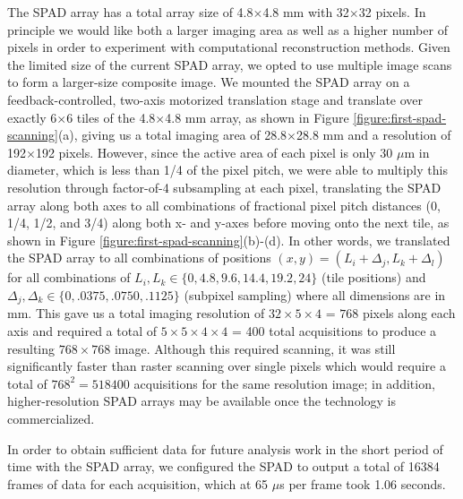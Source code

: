The SPAD array has a total array size of 4.8$\times$4.8 mm with 32$\times$32 pixels. In principle we would like both a larger imaging area as well as a higher number of pixels in order to experiment with computational reconstruction methods. Given the limited size of the current SPAD array, we opted to use multiple image scans to form a larger-size composite image. We mounted the SPAD array on a feedback-controlled, two-axis motorized translation stage and translate over exactly 6$\times$6 tiles of the 4.8$\times$4.8 mm array, as shown in Figure \ref{figure:first-spad-scanning}(a), giving us a total imaging area of 28.8$\times$28.8 mm and a resolution of 192$\times$192 pixels. However, since the active area of each pixel is only 30 $\mu$m in diameter, which is less than 1/4 of the pixel pitch, we were able to multiply this resolution through factor-of-4 subsampling at each pixel, translating the SPAD array along both axes to all combinations of fractional pixel pitch distances (0, 1/4, 1/2, and 3/4) along both x- and y-axes before moving onto the next tile, as shown in Figure \ref{figure:first-spad-scanning}(b)-(d). In other words, we translated the SPAD array to all combinations of positions $(x, y) = (L_i + \Delta_j, L_k + \Delta_l)$ for all combinations of $L_i, L_k \in \{ 0, 4.8, 9.6, 14.4, 19.2, 24\}$ (tile positions) and $\Delta_j, \Delta_k \in \{ 0, .0375, .0750, .1125\}$ (subpixel sampling) where all dimensions are in mm. This gave us a total imaging resolution of $32 \times 5 \times 4$ = $768$ pixels along each axis and required a total of $5 \times 5 \times 4 \times 4$ = 400 total acquisitions to produce a resulting $768\times 768$ image. Although this required scanning, it was still significantly faster than raster scanning over single pixels which would require a total of $768^2 = 518400$ acquisitions for the same resolution image; in addition, higher-resolution SPAD arrays may be available once the technology is commercialized.

In order to obtain sufficient data for future analysis work in the short period of time with the SPAD array, we configured the SPAD to output a total of 16384 frames of data for each acquisition, which at 65 $\mu$s per frame took 1.06 seconds.

